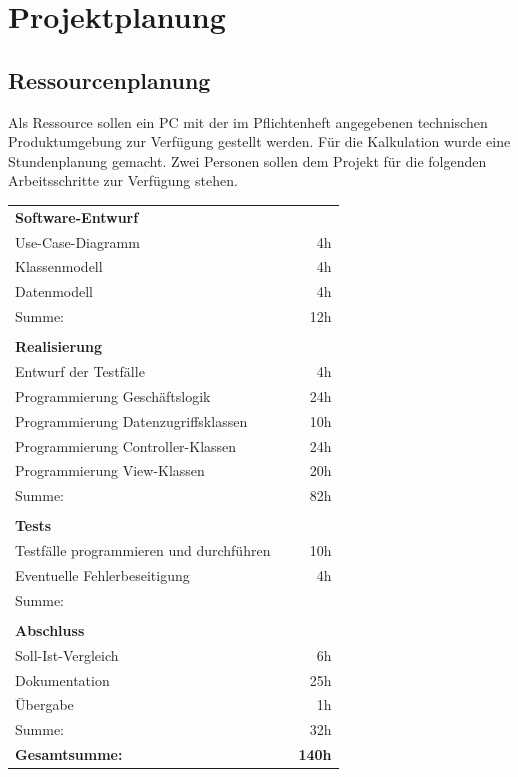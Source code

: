 \documentclass[10pt]{article}
\begin{document}
\section{Projektplanung}
\subsection{Ressourcenplanung}
Als Ressource sollen ein PC mit der im Pflichtenheft angegebenen technischen Produktumgebung zur Verfügung gestellt werden. Für die Kalkulation wurde eine Stundenplanung gemacht. Zwei Personen sollen dem Projekt für die folgenden Arbeitsschritte zur Verfügung stehen.


\FloatBarrier
\begin{table}[ht!]
\begin{tabular}{lcr}
    \multicolumn{3}{l}{\textbf{Software-Entwurf}}\\
    Use-Case-Diagramm& &4h\\
    Klassenmodell & & 4h\\
    Datenmodell & & 4h\\
    \hline
    Summe: & & 12h\\
    \\
    \multicolumn{3}{l}{\textbf{Realisierung}}\\
    Entwurf der Testfälle & &  4h\\
    Programmierung Geschäftslogik& &  24h\\
    Programmierung Datenzugriffsklassen	& &  10h\\
    Programmierung Controller-Klassen& &  24h\\
    Programmierung View-Klassen& &  20h\\
    \hline
    Summe: & & 82h\\
    \\
    \multicolumn{3}{l}{\textbf{Tests}}\\
    Testfälle programmieren und durchführen& &10h\\
    Eventuelle Fehlerbeseitigung& &4h\\
    \hline
    Summe: & &\\
    \\
    \multicolumn{3}{l}{\textbf{Abschluss}}\\
    Soll-Ist-Vergleich& & 6h\\
    Dokumentation& & 25h\\
    Übergabe & & 1h\\
    \hline
    Summe: & &32h\\
   \textbf{Gesamtsumme:} & &\textbf{ 140h}

\end{tabular}
\end{table}
\FloatBarrier
\end{document}

